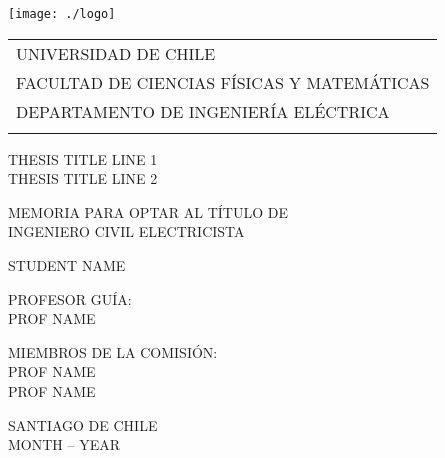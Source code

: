 \documentclass[letterpaper, 12pt]{scrreprt}
\begin{document}
\begin{titlepage}
\hspace{-0.6cm}
  \texttt{[image: ./logo]} 
	\hspace{-0.25cm}
  \begin{tabular}{l}
	\vspace{-0.5mm}
   \small{UNIVERSIDAD DE CHILE} \\
	\vspace{-0.5mm}
 	 \small{FACULTAD DE CIENCIAS FÍSICAS Y MATEM\'ATICAS} \\
 	 \small{DEPARTAMENTO DE INGENIER\'IA EL\'ECTRICA} \\
  \vspace*{1cm}\mbox{}
  \end{tabular}

\vspace*{6cm}
  
\begin{center}
\fontsize{4.8mm}{6mm}\selectfont 
THESIS TITLE LINE 1\\
THESIS TITLE LINE 2\\
	\vspace*{0.8 cm}
  
	\footnotesize{MEMORIA PARA OPTAR AL T\'ITULO DE} \\
  \footnotesize{INGENIERO CIVIL ELECTRICISTA} \\

  \vspace*{1.5 cm}
	
  \normalsize{STUDENT NAME} \\
	
	\vspace{2.7cm}
	
	\footnotesize{PROFESOR GUÍA:} \\
	\vspace{0.08 cm}
	\normalsize{PROF NAME} \\
	
	\vspace{0.7 cm}

	\footnotesize{MIEMBROS DE LA COMISIÓN:} \\
	\vspace{0.08 cm}
	\normalsize{PROF NAME} \\
	\normalsize{PROF NAME}
	
	\vspace*{2.0 cm}
  \footnotesize{SANTIAGO DE CHILE} \\
  \footnotesize{MONTH -- YEAR}
\end{center}

\end{titlepage}
\end{document}
